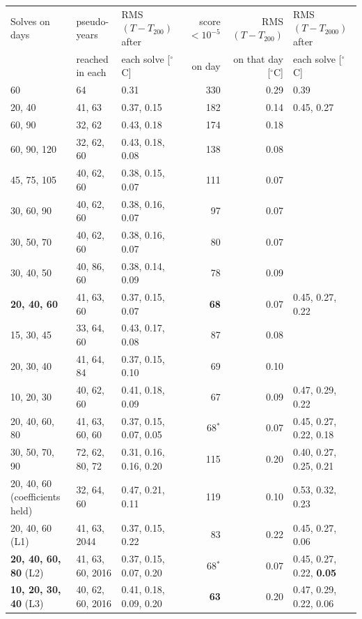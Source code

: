 \documentclass{article}
\begin{document}
\begin{table}[h]
\centering
\footnotesize
\setlength{\tabcolsep}{2.6pt}
\renewcommand{\arraystretch}{1.2}
\begin{tabular}{l|l|l|r|r|l}
\toprule
Solves on days & pseudo-years & RMS$(T-T_{200})$ after & score $<10^{-5}$ & RMS$(T-T_{200})$ & RMS$(T-T_{2000})$ after \\
 & reached in each & each solve [$^\circ$C] & on day & on that day [$^\circ$C] & each solve [$^\circ$C] \\
\midrule
60 & 64 & 0.31 & 330 & 0.29 & 0.39 \\
\midrule
20, 40 & 41, 63 & 0.37, 0.15 & 182 & 0.14 & 0.45, 0.27 \\
60, 90 & 32, 62 & 0.43, 0.18 & 174 & 0.18 & \\
\midrule
60, 90, 120 & 32, 62, 60 & 0.43, 0.18, 0.08 & 138 & 0.08 & \\
45, 75, 105 & 40, 62, 60 & 0.38, 0.15, 0.07 & 111 & 0.07 & \\
30, 60, 90 & 40, 62, 60 & 0.38, 0.16, 0.07 & 97 & 0.07 & \\
30, 50, 70 & 40, 62, 60 & 0.38, 0.16, 0.07 & 80 & 0.07 & \\
30, 40, 50 & 40, 86, 60 & 0.38, 0.14, 0.09 & 78 & 0.09 & \\
\textbf{20, 40, 60} & 41, 63, 60 & 0.37, 0.15, 0.07 & \textbf{68} & 0.07 & 0.45, 0.27, 0.22 \\
15, 30, 45 & 33, 64, 60 & 0.43, 0.17, 0.08 & 87 & 0.08 & \\
20, 30, 40 & 41, 64, 84 & 0.37, 0.15, 0.10 & 69 & 0.10 & \\
10, 20, 30 & 40, 62, 60 & 0.41, 0.18, 0.09 & 67 & 0.09 & 0.47, 0.29, 0.22 \\
\midrule
20, 40, 60, 80 & 41, 63, 60, 60 & 0.37, 0.15, 0.07, 0.05 & 68$^{*}$ & 0.07 & 0.45, 0.27, 0.22, 0.18 \\
30, 50, 70, 90 & 72, 62, 80, 72 & 0.31, 0.16, 0.16, 0.20 & 115 & 0.20 & 0.40, 0.27, 0.25, 0.21 \\
\midrule
20, 40, 60 (coefficients held) & 32, 64, 60 & 0.47, 0.21, 0.11 & 119 & 0.10 & 0.53, 0.32, 0.23 \\
\midrule
20, 40, 60 (L1) & 41, 63, 2044 & 0.37, 0.15, 0.22 & 83 & 0.22 & 0.45, 0.27, 0.06 \\
\textbf{20, 40, 60, 80} (L2) & 41, 63, 60, 2016 & 0.37, 0.15, 0.07, 0.20 & 68$^{*}$ & 0.07 & 0.45, 0.27, 0.22, \textbf{0.05} \\
\textbf{10, 20, 30, 40} (L3) & 40, 62, 60, 2016 & 0.41, 0.18, 0.09, 0.20 & \textbf{63} & 0.20 & 0.47, 0.29, 0.22, 0.06 \\

\end{tabular}
\end{table}
\end{document}
